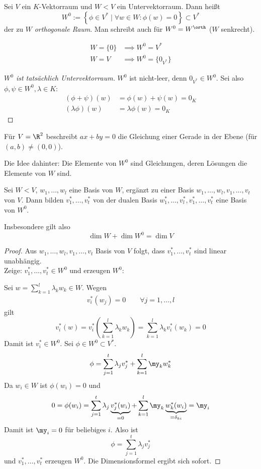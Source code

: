 \documentclass[a4paper, 10pt]{scrbook}
\begin{document}
\begin{df}
\label{df: 9.6}
Sei $V$ ein $K$-Vektorraum und $W<V$ ein Untervektorraum.
Dann heißt
\[
W^0:=\left\{\phi\in V^*\;\big|\;\forall w\in W:\phi(w)=0 \right\} \subset V^*
\]
der zu $W$ \emph{orthogonale Raum}.
Man schreibt auch für $W^0=W^\orth$ ($W$ senkrecht).

\begin{ex}
\begin{align*}
W=\{0\} &\implies W^0=V^*\\
W=V &\implies W^0=\{0_{V^*}\}
\end{align*}
\end{ex}

\begin{proof}[$W^0$ ist tatsächlich Untervektorraum]
$W^0$ ist nicht-leer, denn $0_{V^*}\in W^0$. 
Sei also $\phi,\psi\in W^0, \lambda\in K$:
\begin{align*}
(\phi+\psi)(w)&=\phi(w)+\psi(w)=0_K\\
(\lambda\phi)(w)&=\lambda\phi(w)=0_K
\end{align*}
\end{proof}
\end{df}

\begin{ex}
	Für $V=\R^2$ beschreibt $ax+by=0$ die Gleichung einer Gerade in der Ebene (für $(a,b)\neq (0,0)$).

	Die Idee dahinter: Die Elemente von $W^0$ sind Gleichungen, deren Lösungen die Elemente von $W$ sind.
\end{ex}


\begin{prop}
\label{prop:9.7}
Sei $W<V$, $w_1,\dotsc,w_l$ eine Basis von $W$, ergänzt zu einer Basis $w_1,\dotsc,w_l,v_1,\dotsc,v_t$ von $V$.
Dann bilden $v_1^*,\dotsc,v_t^*$ von der dualen Basis $w_1^*,\dotsc,v_l^*,v_1^*,\dotsc,v_t^*$ eine Basis von $W^0$.

Insbesondere gilt also
\[
\dim W +\dim W^0=\dim V
\]
\begin{proof}
Aus $w_1,\dots,w_l,v_1,\dotsc,v_t$ Basis von $V$ folgt, dass $v_1^*,\dotsc,v_t^*$ sind linear unabhängig.\\
Zeige: $v_1^*,\dotsc,v_t^* \in W^0$ und erzeugen $W^0$:

Sei $w=\sum_{k=1}^l\lambda_kw_k \in W$.
Wegen
\begin{align*}
v_i^*(w_j)=0 \qquad \forall j=1,\dotsc,l
\end{align*}
gilt
\[
v_i^*(w)=v_i^*\left(\sum_{k=1}^l\lambda_kw_k\right)=\sum_{k=1}^l\lambda_kv_i^*(w_k)=0
\]
Damit ist $v_i^*\in W^0$.
Sei $\phi\in W^0\subset V^*$.
\[
	\phi= \sum_{j=1}^t\lambda_jv_j^*+\sum_{k=1}^l\my_kw_k^*
\]
Da $w_i\in W$ ist $\phi(w_i)=0$ und
\[
	0  = \phi(w_i)= \sum_{j=1}^t\lambda_j\underbrace{v_j^*(w_i)}_{=0}+\sum_{k=1}^l\my_k\underbrace{w_k^*(w_i)}_{=\delta_{ki}} = \my_i
\]
Damit ist $\my_i=0$ für beliebiges $i$.
Also ist
\[
\phi=\sum_{j=1}^t\lambda_jv_j^*
\]
und $v_1^*,\dotsc,v_t^*$ erzeugen $W^0$.
Die Dimensionsformel ergibt sich sofort.
\end{proof}

\end{prop}
\end{document}
